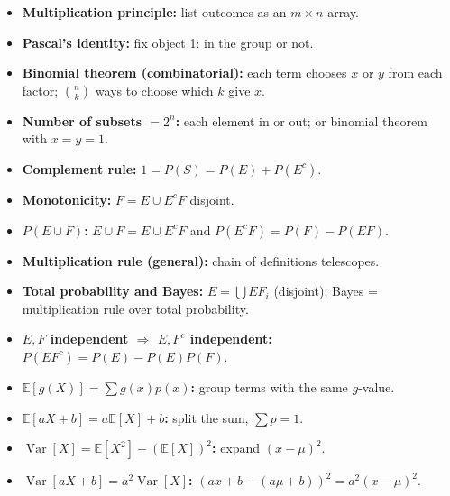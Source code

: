 \documentclass[11pt]{article}
\newcommand{\E}{\mathbb{E}}
\newcommand{\Var}{\operatorname{Var}}
\begin{document}
\begin{defbox}
\begin{itemize}
\item \textbf{Multiplication principle:} list outcomes as an $m\times n$ array.
\item \textbf{Pascal's identity:} fix object 1: in the group or not.
\item \textbf{Binomial theorem (combinatorial):} each term chooses $x$ or $y$ from each factor; $\binom nk$ ways to choose which $k$ give $x$.
\item \textbf{Number of subsets $=2^n$:} each element in or out; or binomial theorem with $x=y=1$.
\item \textbf{Complement rule:} $1=P(S)=P(E)+P(E^c)$.
\item \textbf{Monotonicity:} $F=E\cup E^cF$ disjoint.
\item \textbf{$P(E\cup F)$:} $E\cup F=E\cup E^cF$ and $P(E^cF)=P(F)-P(EF)$.
\item \textbf{Multiplication rule (general):} chain of definitions telescopes.
\item \textbf{Total probability and Bayes:} $E=\bigcup EF_i$ (disjoint); Bayes = multiplication rule over total probability.
\item \textbf{$E,F$ independent $\Rightarrow$ $E,F^c$ independent:} $P(EF^c)=P(E)-P(E)P(F)$.
\item \textbf{$\E[g(X)]=\sum g(x)p(x)$:} group terms with the same $g$-value.
\item \textbf{$\E[aX+b]=a\E[X]+b$:} split the sum, $\sum p=1$.
\item \textbf{$\Var[X]=\E[X^2]-(\E[X])^2$:} expand $(x-\mu)^2$.
\item \textbf{$\Var[aX+b]=a^2\Var[X]$:} $(ax+b-(a\mu+b))^2=a^2(x-\mu)^2$.
\end{itemize}
\end{defbox}
\end{document}
